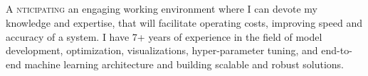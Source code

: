 \documentclass[11pt, a4paper]{article}
\begin{document}
	\begin{center}
		\textcolor{dBlue}{{\HeaderNFont \AuthorFName}\hspace{0.7cm}{\HeaderNFont \AuthorLName}} \\
		\vspace{2pt}
		{\small \textcolor{dBlue}{\CyberPresence}}
		\vspace{-23pt}
	\end{center}

	\textcolor{dBlue}{
		\\ \noindent\makebox[\linewidth]{\rule{\textwidth}{2.1pt}}
		\vspace{-21pt} \\
		\noindent\makebox[\linewidth]{\rule{\paperwidth}{3.9pt}}
		\vspace{-13pt} \\
	}

	\lettrine{\DropCaps A \hspace{1pt}}{nticipating} an engaging working environment where I can devote my knowledge and expertise, that will facilitate operating costs, improving speed and accuracy of a system. I have 7+ years of experience in the field of model development, optimization, visualizations, hyper-parameter tuning, and end-to-end machine learning architecture and building scalable and robust solutions.



	\pagebreak
	\pagebreak
\end{document}
